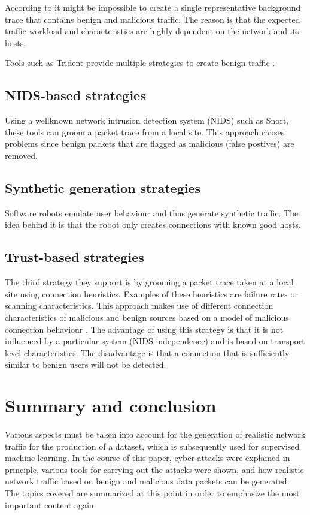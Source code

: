 \documentclass[conference]{IEEEtran}
\begin{document}
\smallskip According to \cite{b10} it might be impossible to create a single representative background trace that contains benign and malicious traffic. The reason is that the expected traffic workload and characteristics are highly dependent on the network and its hosts.

Tools such as Trident provide multiple strategies to create benign traffic \cite{b10}. 

\subsection{NIDS-based strategies}
Using a wellknown network intrusion detection system (NIDS) such as Snort, these tools can groom a packet trace from a local site. This approach causes problems since benign packets that are flagged as malicious (false postives) are removed.

\subsection{Synthetic generation strategies}
Software robots emulate user behaviour and thus generate synthetic traffic. The idea behind it is that the robot only creates connections with known good hosts. 

\subsection{Trust-based strategies}
The third strategy they support is by grooming a packet trace taken at a local site using connection heuristics. Examples of these heuristics are failure rates or scanning characteristics. This approach makes use of different connection characteristics of malicious and benign sources based on a model of malicious connection behaviour \cite{b10}.
The advantage of using this strategy is that it is not influenced by a particular system (NIDS independence) and is based on transport level characteristics. The disadvantage is that a connection that is sufficiently similar to benign users will not be detected.



\section{Summary and conclusion}
Various aspects must be taken into account for the generation of realistic network traffic for the production of a dataset, which is subsequently used for supervised machine learning. In the course of this paper, cyber-attacks were explained in principle, various tools for carrying out the attacks were shown, and how realistic network traffic based on benign and malicious data packets can be generated. The topics covered are summarized at this point in order to emphasize the most important content again.
\end{document}
